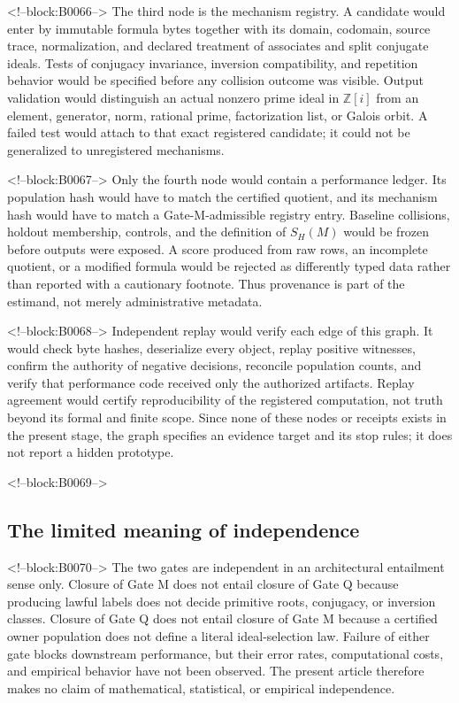 \documentclass[11pt,a4paper]{article}
\begin{document}
<!--block:B0066-->
The third node is the mechanism registry. A candidate would enter by immutable formula bytes together with its domain, codomain, source trace, normalization, and declared treatment of associates and split conjugate ideals. Tests of conjugacy invariance, inversion compatibility, and repetition behavior would be specified before any collision outcome was visible. Output validation would distinguish an actual nonzero prime ideal in \(\mathbb{Z}[i]\) from an element, generator, norm, rational prime, factorization list, or Galois orbit. A failed test would attach to that exact registered candidate; it could not be generalized to unregistered mechanisms.

<!--block:B0067-->
Only the fourth node would contain a performance ledger. Its population hash would have to match the certified quotient, and its mechanism hash would have to match a Gate-M-admissible registry entry. Baseline collisions, holdout membership, controls, and the definition of \(S_H(M)\) would be frozen before outputs were exposed. A score produced from raw rows, an incomplete quotient, or a modified formula would be rejected as differently typed data rather than reported with a cautionary footnote. Thus provenance is part of the estimand, not merely administrative metadata.

<!--block:B0068-->
Independent replay would verify each edge of this graph. It would check byte hashes, deserialize every object, replay positive witnesses, confirm the authority of negative decisions, reconcile population counts, and verify that performance code received only the authorized artifacts. Replay agreement would certify reproducibility of the registered computation, not truth beyond its formal and finite scope. Since none of these nodes or receipts exists in the present stage, the graph specifies an evidence target and its stop rules; it does not report a hidden prototype.

<!--block:B0069-->
\subsection{The limited meaning of independence}

<!--block:B0070-->
The two gates are independent in an architectural entailment sense only. Closure of Gate M does not entail closure of Gate Q because producing lawful labels does not decide primitive roots, conjugacy, or inversion classes. Closure of Gate Q does not entail closure of Gate M because a certified owner population does not define a literal ideal-selection law. Failure of either gate blocks downstream performance, but their error rates, computational costs, and empirical behavior have not been observed. The present article therefore makes no claim of mathematical, statistical, or empirical independence.
\end{document}
